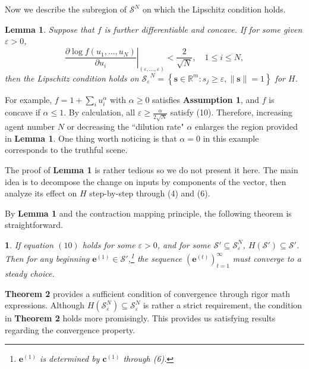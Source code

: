\documentclass[12pt,english]{article}
\theoremstyle{plain}
\theoremstyle{plain}
\newtheorem{thm}{\protect\theoremname}
\newtheorem{lemma}{Lemma}
\providecommand{\theoremname}{Theorem}
\begin{document}
	Now we describe the subregion of $\mathcal{S}^N$ on which the Lipschitz condition holds. 
	
	\begin{lemma}
		
		Suppose that $f$ is further differentiable and concave. If for some given $\varepsilon > 0$,
		\begin{equation}
			\left.\frac{\partial\log f(u_1,\dots, u_N)}{\partial u_i}\right|_{(\varepsilon, \dots, \varepsilon)} < \frac{2}{\sqrt{N}},\quad 1\leqslant i \leqslant N,
		\end{equation}
		then the Lipschitz condition holds on $\mathcal{S_{\varepsilon}}^N = \left\{\mathbf{s}\in \mathbb{R}^m: s_j \geqslant \varepsilon, \lVert \mathbf{s}\rVert = 1 \right\}$ for $H$.
	\end{lemma}
	
	For example, $f = 1 + \sum_{i}u_i^\alpha$ with $\alpha\geqslant 0$ satisfies \textbf{Assumption 1}, and $f$ is concave if $\alpha\leqslant 1$. By calculation, all $\varepsilon \geqslant \frac{\alpha}{2\sqrt{N}}$ satisfy (10). Therefore, increasing agent number $N$ or decreasing the ``dilution rate" $\alpha$ enlarges the region provided in \textbf{Lemma 1}. One thing worth noticing is that $\alpha = 0$ in this example corresponds to the truthful scene.\par 
	The proof of \textbf{Lemma 1} is rather tedious so we do not present it here. The main idea is to decompose the change on inputs by components of the vector, then analyze its effect on $H$ step-by-step through (4) and (6).\par 
	
	By \textbf{Lemma 1} and the contraction mapping principle, the following theorem is straightforward.
	
	\begin{thm}
		If equation $(10)$ holds for some $\varepsilon > 0$, and for some $\mathcal{S}'\subseteq \mathcal{S}_\varepsilon^N$, $H\left(\mathcal{S}'\right) \subseteq \mathcal{S}'$. Then for any beginning $\mathbf{e}^{(1)}\in\mathcal{S}'$,\footnote{$\mathbf{e}^{(1)}$ is determined by $\mathbf{c}^{(1)}$ through (6).} the sequence $\left(\mathbf{e}^{(t)}\right)_{t = 1}^{\infty}$ must converge to a steady choice.
	\end{thm}
	\textbf{Theorem 2} provides a sufficient condition of convergence through rigor math expressions. Although $H\left(\mathcal{S}_\varepsilon^N\right) \subseteq \mathcal{S}_\varepsilon^N$ is rather a strict requirement, the condition in \textbf{Theorem 2} holds more promisingly. This provides us satisfying results regarding the convergence property.\par 
	
\end{document}
